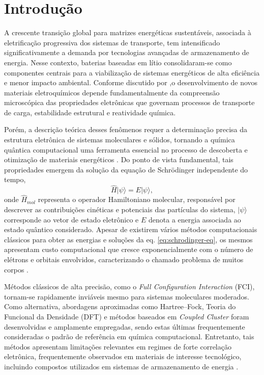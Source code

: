 \section{Introdução}

A crescente transição global para matrizes energéticas sustentáveis,
associada à eletrificação progressiva dos sistemas de transporte,
tem intensificado significativamente a demanda por tecnologias
avançadas de armazenamento de energia.
Nesse contexto, baterias baseadas em lítio consolidaram-se como
componentes centrais para a viabilização de sistemas energéticos
de alta eficiência e menor impacto ambiental. Conforme discutido por 
\textcite{machin2024advancements},o desenvolvimento de novos materiais eletroquímicos depende
fundamentalmente da compreensão microscópica das propriedades
eletrônicas que governam processos de transporte de carga,
estabilidade estrutural e reatividade química.

Porém, a descrição teórica desses fenômenos requer a determinação precisa da
estrutura eletrônica de sistemas moleculares e sólidos, tornando a
química quântica computacional uma ferramenta essencial no processo
de descoberta e otimização de materiais energéticos
\cite{aspuru-guzikSimulatedQuantumComputation2005,whitfieldSimulationElectronicStructure2011,cao2019quantum, kim2022fault}. Do ponto de vista fundamental, tais propriedades emergem da solução
da equação de Schrödinger independente do tempo,
\begin{equation}
\label{eq:schrodinger-eq}
\hat{H}|\psi\rangle = E|\psi\rangle,
\end{equation}
onde $\hat{H}_{mol}$ representa o operador Hamiltoniano molecular,
responsável por descrever as contribuições cinéticas e potenciais
das partículas do sistema, $|\psi\rangle$ corresponde ao vetor de
estado eletrônico e $E$ denota a energia associada ao estado
quântico considerado. Apesar de existirem vários métodos computacionais clássicos para obter as energias e soluções da eq. \ref{eq:schrodinger-eq}, os mesmos apresentam custo computacional que cresce
exponencialmente com o número de elétrons e orbitais envolvidos, caracterizando o chamado problema de muitos corpos
\cite{aspuru-guzikSimulatedQuantumComputation2005}.


Métodos clássicos de alta precisão, como o
\textit{Full Configuration Interaction} (FCI),
tornam-se rapidamente inviáveis mesmo para sistemas moleculares
moderados.
Como alternativa, abordagens aproximadas como Hartree–Fock,
Teoria do Funcional da Densidade (DFT) e métodos baseados em
\textit{Coupled Cluster} foram desenvolvidas e amplamente empregadas,
sendo estas últimas frequentemente consideradas o padrão de
referência em química computacional.
Entretanto, tais métodos apresentam limitações relevantes em regimes
de forte correlação eletrônica, frequentemente observados em
materiais de interesse tecnológico,
incluindo compostos utilizados em sistemas de armazenamento de energia
\cite{tilly2022variational}.


